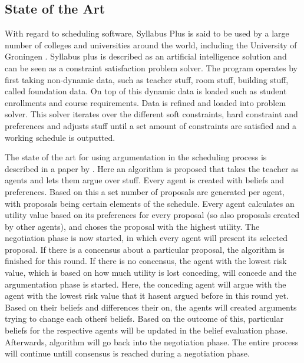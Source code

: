 \subsection{State of the Art}
With regard to scheduling software, Syllabus Plus is said to be used by a large number of colleges and universities around the world, including the University of Groningen \cite{SyllabusPlus}. Syllabus plus is described as an artificial intelligence solution and can be seen as a constraint satisfaction problem solver. The program operates by first taking non-dynamic data, such as teacher stuff, room stuff, building stuff, called foundation data. On top of this dynamic data is loaded such as student enrollments and course requirements. Data is refined and loaded into problem solver. This solver iterates over the different soft constraints, hard constraint and preferences and adjusts stuff until a set amount of constraints are satisfied and a working schedule is outputted.  

The state of the art for using argumentation in the scheduling process is described in a paper by \cite{Kuo:jc}. Here an algorithm is proposed that takes the teacher as agents and lets them argue over stuff. Every agent is created with beliefs and preferences. Based on this a set number of proposals are generated per agent, with proposals being certain elements of the schedule. Every agent calculates an utility value based on its preferences for every proposal (so also proposals created by other agents), and choses the proposal with the highest utility. The negotiation phase is now started, in which every agent will present its selected proposal. If there is a concensus about a particular proposal, the algorithm is finished for this round. If there is no concensus, the agent with the lowest risk value, which is based on how much utility is lost conceding, will concede and the argumentation phase is started. Here, the conceding agent will argue with the agent with the lowest risk value  that it hasent argued before in this round yet. Based on their beliefs and differences their on, the agents will created arguments trying to change each other\'s beliefs. Based on the outcome of this, particular beliefs for the respective agents will be updated in the belief evaluation phase. Afterwards, algorithm will go back into the negotiation phase. The entire process will continue untill consensus is reached during a negotiation phase.